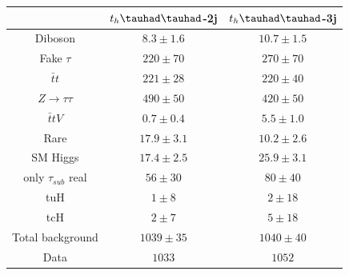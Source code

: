 \begin{table}[htbp]
\begin{tabular}{ccc} \toprule\toprule
& $t_{h}\thadhad$-2j & $t_{h}\thadhad$-3j\\\midrule
  Diboson                  & $8.3 \pm 1.6  $ & $ 10.7 \pm 1.5 $\\
  Fake $\tau$              & $220 \pm 70   $ & $ 270 \pm 70   $\\
  $\bar{t}t$               & $221 \pm 28   $ & $ 220 \pm 40   $\\
  $Z\rightarrow\tau\tau$   & $490 \pm 50   $ & $ 420 \pm 50   $\\
  $\bar{t}tV$              & $0.7 \pm 0.4  $ & $ 5.5 \pm 1.0  $\\
  Rare                     & $17.9 \pm 3.1 $ & $ 10.2 \pm 2.6 $\\
  SM Higgs                 & $17.4 \pm 2.5 $ & $ 25.9 \pm 3.1 $\\
  only $\tau_{sub}$ real   & $56 \pm 30    $ & $ 80 \pm 40    $ \\ \midrule
  tuH                      & $1 \pm 8      $ & $ 2 \pm 18     $\\
  tcH                      & $2 \pm 7      $ & $ 5 \pm 18     $\\ \midrule
  Total background         & $1039 \pm 35  $ & $ 1040 \pm 40  $\\ \midrule
  Data                     & $1033         $ & $ 1052         $\\
\bottomrule\bottomrule
\end{tabular}
\label{tab:HtautauPostfitYieldsUnblind}
\end{table}




